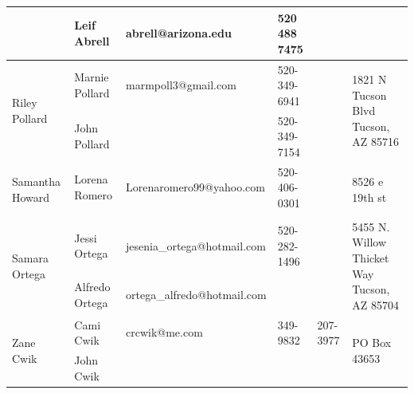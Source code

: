 \documentclass[landscape]{article}\usepackage[]{graphicx}\usepackage[]{color}
\begin{document}
\begin{longtable}{|p{100pt}|p{100pt}|p{140pt}|p{60pt}|p{64pt}|p{120pt}|}
 & Leif Abrell & abrell@arizona.edu & 520 488 7475 &  & \\
\hline
\multirow{2}{100pt}{Riley Pollard} & Marnie Pollard & marmpoll3@gmail.com & 520-349-6941 &  & \multirow{2}{120pt}{1821 N Tucson Blvd Tucson, AZ 85716} \\
 & John Pollard &  & 520-349-7154 &  & \\
\hline
\multirow{2}{100pt}{Samantha Howard} & Lorena Romero  & Lorenaromero99@yahoo.com  & 520-406-0301 &  & \multirow{2}{120pt}{8526 e 19th st} \\
 &  &  &  &  & \\
\hline
\multirow{2}{100pt}{Samara Ortega} & Jessi Ortega & jesenia\_ortega@hotmail.com & 520-282-1496 &  & \multirow{2}{120pt}{5455 N. Willow Thicket Way Tucson, AZ 85704} \\
 & Alfredo Ortega & ortega\_alfredo@hotmail.com &  &  & \\
\hline
\multirow{2}{100pt}{Zane Cwik} & Cami Cwik & crcwik@me.com & 349-9832 & 207-3977 & \multirow{2}{120pt}{PO Box 43653} \\
 & John Cwik  &  &  &  & \\
\hline
\end{longtable}
\newpage
\end{document}
